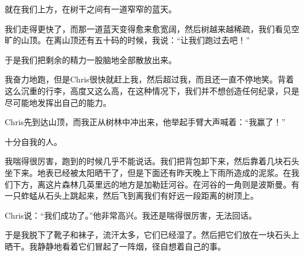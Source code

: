 \documentclass[UTF8]{article}
\begin{document}
\par 就在我们上方，在树干之间有一道窄窄的蓝天。
\par 我们走得更快了，而那一道蓝天变得愈来愈宽阔，然后树越来越稀疏，我们看见空旷的山顶。在离山顶还有五十码的时候，我说：“让我们跑过去吧！”
\par 于是我们把剩余的精力一股脑地全部散放出来。
\par 我奋力地跑，但是Chris很快就赶上我，然后超过我，而且还一直不停地笑。背着这么沉重的行李，高度又这么高，在这种情况下，我们并不想创造任何纪录，只是尽可能地发挥出自己的能力。
\par Chris先到达山顶，而我正从树林中冲出来，他举起手臂大声喊着：“我赢了！”
\par 十分自我的人。
\par 我喘得很厉害，跑到的时候几乎不能说话。我们把背包卸下来，然后靠着几块石头坐下来。地表已经被太阳晒干了，但是下面还有昨天晚上下雨所造成的泥浆。在我们下方，离这片森林几英里远的地方是加勒廷河谷。在河谷的一角则是波斯曼。有一只蚱蜢从石头上跳起来，然后飞到离我们有好远一段距离的树顶上。
\par Chris说：“我们成功了。”他非常高兴。我还是喘得很厉害，无法回话。
\par 于是我脱下了靴子和袜子，流汗太多，它们已经湿了。然后把它们放在一块石头上晒干。我静静地看着它们冒起了一阵烟，径自想着自己的事。
\end{document}
